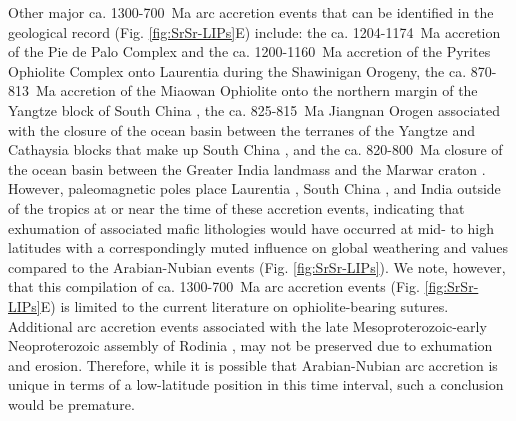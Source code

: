 Other major ca. 1300-700~Ma arc accretion events that can be identified in the geological record (Fig. \ref{fig:SrSr-LIPs}E) include: the ca. 1204-1174~Ma accretion of the Pie de Palo Complex \citep{Vujovich1998a, Vujovich2004a} and the ca. 1200-1160~Ma accretion of the Pyrites Ophiolite Complex \citep{McLelland2013a} onto Laurentia during the Shawinigan Orogeny, the ca. 870-813~Ma accretion of the Miaowan Ophiolite onto the northern margin of the Yangtze block of South China \citep{Peng2012a}, the ca. 825-815~Ma Jiangnan Orogen associated with the closure of the ocean basin between the terranes of the Yangtze and Cathaysia blocks that make up South China \citep{Zhao2015a}, and the ca. 820-800~Ma closure of the ocean basin between the Greater India landmass and the Marwar craton \citep{Volpe1990a, Chatterjee2017a}. However, paleomagnetic poles place Laurentia \citep{Palmer1977a, Buchan2000a}, South China \citep{Li2004a, Niu2016a}, and India \citep{Meert2013a} outside of the tropics at or near the time of these accretion events, indicating that exhumation of associated mafic lithologies would have occurred at mid- to high latitudes with a correspondingly muted influence on global weathering and \SrSr values compared to the Arabian-Nubian events (Fig. \ref{fig:SrSr-LIPs}). We note, however, that this compilation of ca. 1300-700~Ma arc accretion events (Fig. \ref{fig:SrSr-LIPs}E) is limited to the current literature on ophiolite-bearing sutures. Additional arc accretion events associated with the late Mesoproterozoic-early Neoproterozoic assembly of Rodinia \citep{Cawood2016a}, may not be preserved due to exhumation and erosion. Therefore, while it is possible that Arabian-Nubian arc accretion is unique in terms of a low-latitude position in this time interval, such a conclusion would be premature.

